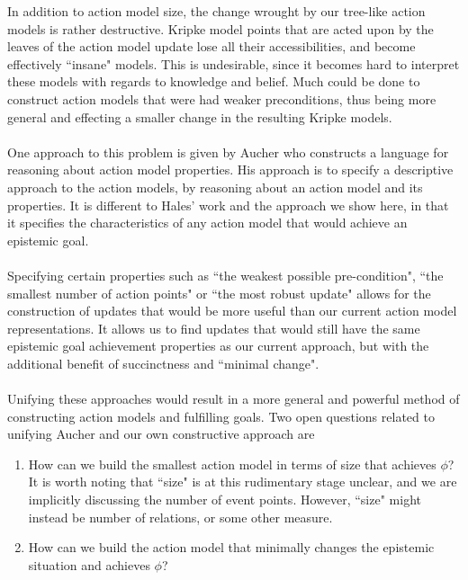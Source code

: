In addition to action model size, the change wrought by our tree-like action
models is rather destructive.
Kripke model points that are acted upon by the leaves of the action model update
lose all their accessibilities, and become effectively ``insane" models.
This is undesirable, since it becomes hard to interpret these models with
regards to knowledge and belief.
Much could be done to construct action models that were had weaker
preconditions, thus being more general and effecting a smaller change in the
resulting Kripke models.\\
\\
One approach to this problem is given by Aucher \cite{doi:10.3166/jancl.21.289-321,doi:10.1080/11663081.2012.736703}
who constructs a language for reasoning about action model properties.
His approach is to specify a descriptive approach to the action models, by
reasoning about an action model and its properties.
It is different to Hales' work and the approach we show here, in that it
specifies the characteristics of any action model that would achieve an
epistemic goal.\\
\\
Specifying certain properties such as ``the weakest possible pre-condition",
``the smallest number of action points" or ``the most robust update" allows for
the construction of updates that would be more useful than our
current action model representations.
It allows us to find updates that would still have the same epistemic goal
achievement properties as our current approach, but with the additional benefit
of succinctness and ``minimal change".\\
\\
Unifying these approaches would result in a more general and powerful method of constructing action
models and fulfilling goals.
Two open questions related to unifying Aucher and our own constructive approach are
\begin{enumerate}
	\item How can we build the smallest action model in terms of size that achieves $\phi$?
		It is worth noting that ``size" is at this rudimentary stage unclear, and we are implicitly discussing the
		number of event points.
		However, ``size" might instead be number of relations, or some other measure.
	\item How can we build the action model that minimally changes the epistemic situation and achieves
		$\phi$?
\end{enumerate}


